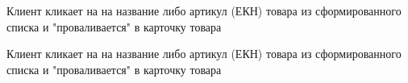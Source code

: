 {


\begin{wiki}
Клиент кликает на на название либо артикул (ЕКН) товара из сформированного списка и "проваливается" в карточку товара
\end{wiki}


\begin{itogo}
Клиент кликает на на название либо артикул (ЕКН) товара из сформированного списка и "проваливается" в карточку товара
\end{itogo}





}


